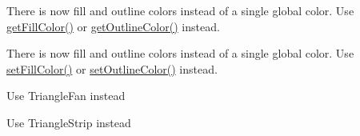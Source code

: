 \begin{DoxyRefList}
%
There is now fill and outline colors instead of a single global color. Use \mbox{\hyperlink{classsf_1_1_text_a6b4ba8c435b59e1e05f831e6230dc537}{get\+Fill\+Color()}} or \mbox{\hyperlink{classsf_1_1_text_a53559d563461089f1172571b375442dc}{get\+Outline\+Color()}} instead. 
\item[Member \mbox{\hyperlink{classsf_1_1_text_a6ce65272d6d63ed01118366e92c68132}{sf\+::Text\+::set\+Color}} (const \mbox{\hyperlink{classsf_1_1_color}{Color}} \&color)]\label{deprecated__deprecated000016}%
%
There is now fill and outline colors instead of a single global color. Use \mbox{\hyperlink{classsf_1_1_text_ab7bb3babac5a6da1802b2c3e1a3e6dcc}{set\+Fill\+Color()}} or \mbox{\hyperlink{classsf_1_1_text_aa19ec69c3b894e963602a6804ca68fe4}{set\+Outline\+Color()}} instead. 
\item[Member \mbox{\hyperlink{group__graphics_gga5ee56ac1339984909610713096283b1ba5338a2c6d922151fe50f235036af8a20}{sf\+::Triangles\+Fan}} ]\label{deprecated__deprecated000003}%
%
Use Triangle\+Fan instead  
\item[Member \mbox{\hyperlink{group__graphics_gga5ee56ac1339984909610713096283b1ba66643dbbb24bbacb405973ed80eebae0}{sf\+::Triangles\+Strip}} ]\label{deprecated__deprecated000002}%
%
Use Triangle\+Strip instead 
\end{DoxyRefList}